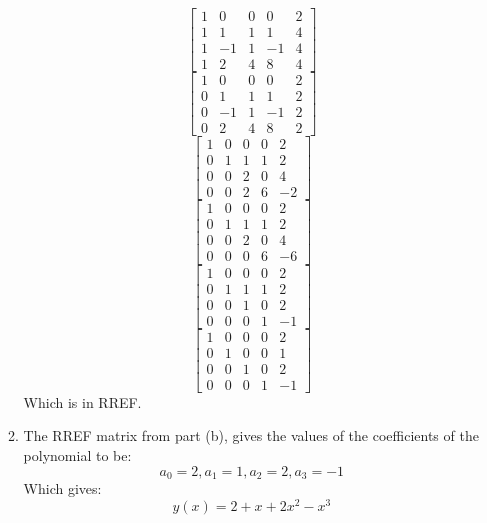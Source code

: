 \documentclass{article}
\begin{document}
\begin{enumerate}
\begin{enumerate}
        $$\begin{bmatrix}
            1 & 0 & 0 & 0 & 2 \\
            1 & 1 & 1 & 1 & 4 \\
            1 & -1 & 1 & -1 & 4 \\
            1 & 2 & 4 & 8 & 4 
        \end{bmatrix}$$
        $$\begin{bmatrix}
            1 & 0 & 0 & 0 & 2 \\
            0 & 1 & 1 & 1 & 2 \\
            0 & -1 & 1 & -1 & 2 \\
            0 & 2 & 4 & 8 & 2
        \end{bmatrix}$$
        $$\begin{bmatrix}
            1 & 0 & 0 & 0 & 2 \\
            0 & 1 & 1 & 1 & 2 \\
            0 & 0 & 2 & 0 & 4 \\
            0 & 0 & 2 & 6 & -2
        \end{bmatrix}$$
        $$\begin{bmatrix}
            1 & 0 & 0 & 0 & 2 \\
            0 & 1 & 1 & 1 & 2 \\
            0 & 0 & 2 & 0 & 4 \\
            0 & 0 & 0 & 6 & -6
        \end{bmatrix}$$
        $$\begin{bmatrix}
            1 & 0 & 0 & 0 & 2 \\
            0 & 1 & 1 & 1 & 2 \\
            0 & 0 & 1 & 0 & 2 \\
            0 & 0 & 0 & 1 & -1
        \end{bmatrix}$$
        $$\begin{bmatrix}
            1 & 0 & 0 & 0 & 2 \\
            0 & 1 & 0 & 0 & 1 \\
            0 & 0 & 1 & 0 & 2 \\
            0 & 0 & 0 & 1 & -1
        \end{bmatrix}$$
        Which is in RREF.
        \item The RREF matrix from part (b), gives the values of the coefficients of the polynomial to be:
        \[a_0 = 2, a_1 = 1, a_2 = 2, a_3 = -1\]
        Which gives: 
        \[y(x) = 2 + x + 2x^2 - x^3\]
    \end{enumerate}


\end{enumerate}
\end{document}
